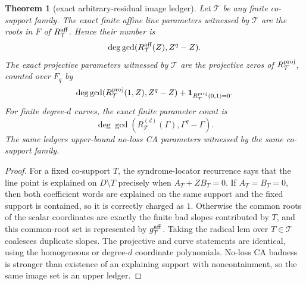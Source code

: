 \documentclass[11pt]{article}
\newtheorem{theorem}{Theorem}[section]
\theoremstyle{definition}
\theoremstyle{remark}
\begin{document}
\begin{theorem}[exact arbitrary-residual image ledger]
\label{thm:exact-arbitrary-residual-image-ledger}
Let $\mathcal T$ be any finite co-support family.  The exact finite affine line
parameters witnessed by $\mathcal T$ are the roots in $F$ of
$R_{\mathcal T}^{\rm aff}$.  Hence their number is
\[
        \deg\gcd(R_{\mathcal T}^{\rm aff}(Z),Z^q-Z).
\]
The exact projective parameters witnessed by $\mathcal T$ are the projective
zeros of $R_{\mathcal T}^{\rm proj}$, counted over $F_q$ by
\[
        \deg\gcd(R_{\mathcal T}^{\rm proj}(1,Z),Z^q-Z)
        +\mathbf 1_{R_{\mathcal T}^{\rm proj}(0,1)=0}.
\]
For finite degree-$d$ curves, the exact finite parameter count is
\[
        \deg\gcd(R_{\mathcal T}^{(d)}(\Gamma),\Gamma^q-\Gamma).
\]
The same ledgers upper-bound no-loss CA parameters witnessed by the same
co-support family.
\end{theorem}

\begin{proof}
For a fixed co-support $T$, the syndrome-locator recurrence says that the line
point is explained on $D\setminus T$ precisely when
$A_T+ZB_T=0$.  If $A_T=B_T=0$, then both coefficient words are explained on the
same support and the fixed support is contained, so it is correctly charged as
$1$.  Otherwise the common roots of the scalar coordinates are exactly the
finite bad slopes contributed by $T$, and this common-root set is represented by
$g_T^{\rm aff}$.  Taking the radical lcm over $T\in\mathcal T$ coalesces duplicate
slopes.  The projective and curve statements are identical, using the homogeneous
or degree-$d$ coordinate polynomials.  No-loss CA badness is stronger than
existence of an explaining support with noncontainment, so the same image set is
an upper ledger.
\end{proof}
\end{document}
